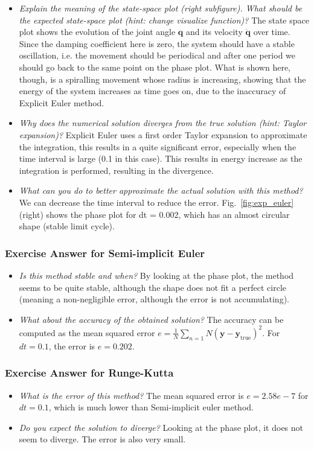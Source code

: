 \begin{itemize}
\item \emph{Explain the meaning of the state-space plot (right subfigure). What should be the expected state-space plot (hint: change visualize function)?}
The state space plot shows the evolution of the joint angle $\bm{q}$ and its velocity $\dot{\bm{q}}$ over time. Since the damping coefficient here is zero, the system should have a stable oscillation, i.e. the movement should be periodical and after one period we should go back to the same point on the phase plot. What is shown here, though, is a spiralling movement whose radius is increasing, showing that the energy of the system increases as time goes on, due to the inaccuracy of Explicit Euler method.
\item \emph{Why does the numerical solution diverges from the true solution (hint: Taylor expansion)?}
Explicit Euler uses a first order Taylor expansion to approximate the integration, this results in a quite significant error, especially when the time interval is large (0.1 in this case). This results in energy increase as the integration is performed, resulting in the divergence.
\item \emph{What can you do to better approximate the actual solution with this method?}
We can decrease the time interval to reduce the error. Fig.~\ref{fig:exp_euler} (right) shows the phase plot for dt = 0.002, which has an almost circular shape (stable limit cycle).
\end{itemize}

\subsubsection{Exercise Answer for Semi-implicit Euler}
\begin{itemize}

\item \emph{Is this method stable and when?}
By looking at the phase plot, the method seems to be quite stable, although the shape does not fit a perfect circle (meaning a non-negligible error, although the error is not accumulating). 

\item \emph{What about the accuracy of the obtained solution?}
The accuracy can be computed as the mean squared error $e = \frac{1}{N} \sum_{n=1}{N} (\bm{y}-\bm{y}_{\text{true}})^2$. For $dt = 0.1$, the error is $e = 0.202$.  
\end{itemize}

\subsubsection{Exercise Answer for Runge-Kutta}
\begin{itemize}
\item \emph{What is the error of this method?}
The mean squared error is $e = 2.58e-7$ for $dt = 0.1$, which is much lower than Semi-implicit euler method. 

\item \emph{Do you expect the solution to diverge?}
Looking at the phase plot, it does not seem to diverge. The error is also very small. 
\end{itemize}


